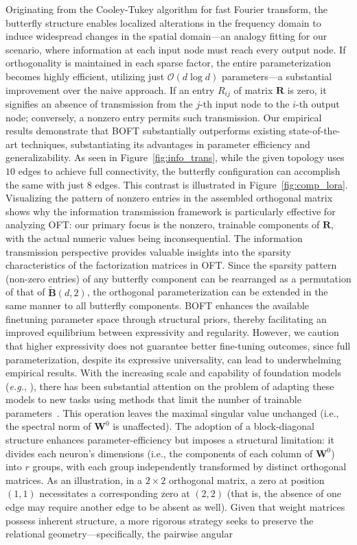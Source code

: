 Originating from the Cooley-Tukey algorithm for fast Fourier transform, the butterfly structure enables localized alterations in the frequency domain to induce widespread changes in the spatial domain—an analogy fitting for our scenario, where information at each input node must reach every output node. If orthogonality is maintained in each sparse factor, the entire parameterization becomes highly efficient, utilizing just $\mathcal{O}(d\log d)$ parameters—a substantial improvement over the naive approach. If an entry $R_{ij}$ of matrix $\bm{R}$ is zero, it signifies an absence of transmission from the $j$-th input node to the $i$-th output node; conversely, a nonzero entry permits such transmission. Our empirical results demonstrate that BOFT substantially outperforms existing state-of-the-art techniques, substantiating its advantages in parameter efficiency and generalizability. As seen in Figure~\ref{fig:info_trans}, while the given topology uses $10$ edges to achieve full connectivity, the butterfly configuration can accomplish the same with just $8$ edges. This contrast is illustrated in Figure~\ref{fig:comp_lora}. Visualizing the pattern of nonzero entries in the assembled orthogonal matrix shows why the information transmission framework is particularly effective for analyzing OFT: our primary focus is the nonzero, trainable components of $\bm{R}$, with the actual numeric values being inconsequential. The information transmission perspective provides valuable insights into the sparsity characteristics of the factorization matrices in OFT. Since the sparsity pattern (non-zero entries) of any butterfly component can be rearranged as a permutation of that of $\tilde{\bm{B}}(d,2)$, the orthogonal parameterization can be extended in the same manner to all butterfly components. BOFT enhances the available finetuning parameter space through structural priors, thereby facilitating an improved equilibrium between expressivity and regularity. However, we caution that higher expressivity does not guarantee better fine-tuning outcomes, since full parameterization, despite its expressive universality, can lead to underwhelming empirical results. With the increasing scale and capability of foundation models (\emph{e.g.}, \cite{brown2020language,radford2021learning,rombach2022high,kirillov2023segment}), there has been substantial attention on the problem of adapting these models to new tasks using methods that limit the number of trainable parameters~\cite{treviso2023efficient,ding2023parameter,lialin2023scaling}. This operation leaves the maximal singular value unchanged (i.e., the spectral norm of $\bm{W}^0$ is unaffected). The adoption of a block-diagonal structure enhances parameter-efficiency but imposes a structural limitation: it divides each neuron's dimensions (i.e., the components of each column of $\bm{W}^0$) into $r$ groups, with each group independently transformed by distinct orthogonal matrices. As an illustration, in a $2\times 2$ orthogonal matrix, a zero at position $(1,1)$ necessitates a corresponding zero at $(2,2)$ (that is, the absence of one edge may require another edge to be absent as well). Given that weight matrices possess inherent structure, a more rigorous strategy seeks to preserve the relational geometry—specifically, the pairwise angular 